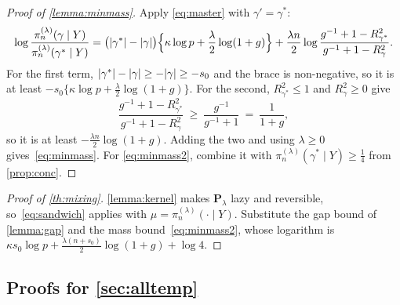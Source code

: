 \begin{proof}[Proof of \cref{lemma:minmass}]
    Apply \eqref{eq:master} with $\gamma'=\gamma^{\ast}$:
    \begin{equation*}
        \log\frac{\pi_n^{(\lambda)}(\gamma\mid Y)}
        {\pi_n^{(\lambda)}(\gamma^{\ast}\mid Y)}
        =\bigl(\lvert\gamma^{\ast}\rvert-\lvert\gamma\rvert\bigr)
        \Bigl\{\kappa\log p+\frac{\lambda}{2}\log(1+g)\Bigr\}
        +\frac{\lambda n}{2}
        \log\frac{g^{-1}+1-R^{2}_{\gamma^{\ast}}}
        {g^{-1}+1-R^{2}_{\gamma}} .
    \end{equation*}
    For the first term, $\lvert\gamma^{\ast}\rvert-\lvert\gamma\rvert\geq-\lvert\gamma\rvert
    \geq-s_0$ and the brace is non-negative, so it is at least
    $-s_0\{\kappa\log p+\tfrac{\lambda}{2}\log(1+g)\}$. For the second,
    $R^{2}_{\gamma^{\ast}}\leq1$ and $R^{2}_{\gamma}\geq0$ give
    \begin{equation*}
        \frac{g^{-1}+1-R^{2}_{\gamma^{\ast}}}
        {g^{-1}+1-R^{2}_{\gamma}}
        \ \geq\ \frac{g^{-1}}{g^{-1}+1}\ =\ \frac{1}{1+g},
    \end{equation*}
    so it is at least $-\tfrac{\lambda n}{2}\log(1+g)$. Adding the two
    and using $\lambda\geq0$ gives~\eqref{eq:minmass}. For
    \eqref{eq:minmass2}, combine it with $\pi_n^{(\lambda)}
    (\gamma^{\ast}\mid Y)\geq\tfrac14$ from \cref{prop:conc}.
\end{proof}

\begin{proof}[Proof of \cref{th:mixing}]
    \cref{lemma:kernel} makes $\mathbf{P}_\lambda$ lazy and reversible,
    so~\eqref{eq:sandwich} applies with
    $\mu=\pi_n^{(\lambda)}(\cdot\mid Y)$. Substitute the gap bound
    of \cref{lemma:gap} and the mass bound~\eqref{eq:minmass2}, whose
    logarithm is $\kappa s_0\log p+\tfrac{\lambda(n+s_0)}{2}\log(1+g)
    +\log4$.
\end{proof}

\subsection{Proofs for \cref{sec:alltemp}}
\label{sub:appall}

